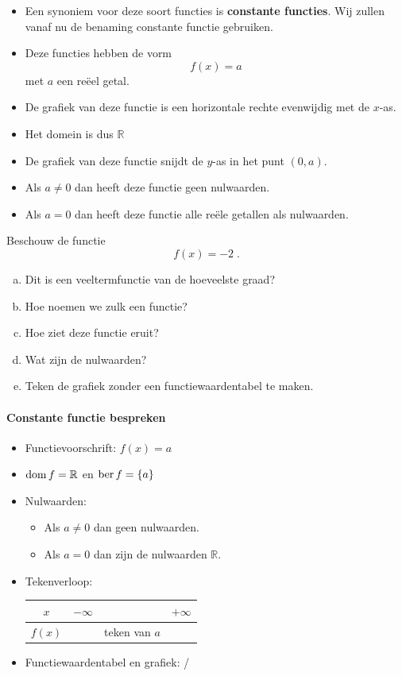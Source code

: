 \documentclass[12pt,twoside,a4paper]{article}
\begin{document}
\begin{itemize}
\item Een synoniem voor deze soort functies is {\bf constante functies}. Wij zullen vanaf nu de benaming constante functie gebruiken.
\item Deze functies hebben de vorm
  $$f(x) = a$$
  met $a$ een reëel getal.
\item De grafiek van deze functie is een horizontale rechte evenwijdig met de $x$-as.
\item Het domein is dus $\mathbb{R}$
\item De grafiek van deze functie snijdt de $y$-as in het punt $(0, a)$.
\item Als $a\neq 0$ dan heeft deze functie geen nulwaarden.
\item Als $a=0$ dan heeft deze functie alle reële getallen als nulwaarden.
\end{itemize}

\begin{oefening}
  Beschouw de functie
  $$f(x)=-2\;.$$
  \begin{enumerate}[(a)]
  \item Dit is een veeltermfunctie van de hoeveelste graad?
  \item Hoe noemen we zulk een functie?
  \item Hoe ziet deze functie eruit?
  \item Wat zijn de nulwaarden?
  \item Teken de grafiek zonder een functiewaardentabel te maken.
  \end{enumerate}
\end{oefening}

\paragraph*{Constante functie bespreken}
\begin{mdframed}
  \begin{itemize}
  \item Functievoorschrift: $f(x)=a$
  \item $\dom f = \mathbb{R}$ en $\ber f = \{a\}$
  \item Nulwaarden:
    \begin{itemize}
    \item Als $a\neq 0$ dan geen nulwaarden.
    \item Als $a=0$ dan zijn de nulwaarden $\mathbb{R}$.
    \end{itemize}
  \item Tekenverloop:
    \begin{center}
      \begin{tabular}{c|lcr}
        $x$ & $-\infty$ & & $+\infty$\\
        \hline
        $f(x)$ & & teken van $a$ &
      \end{tabular}
    \end{center}
  \item Functiewaardentabel en grafiek: /
  \end{itemize}
\end{mdframed}
\end{document}
